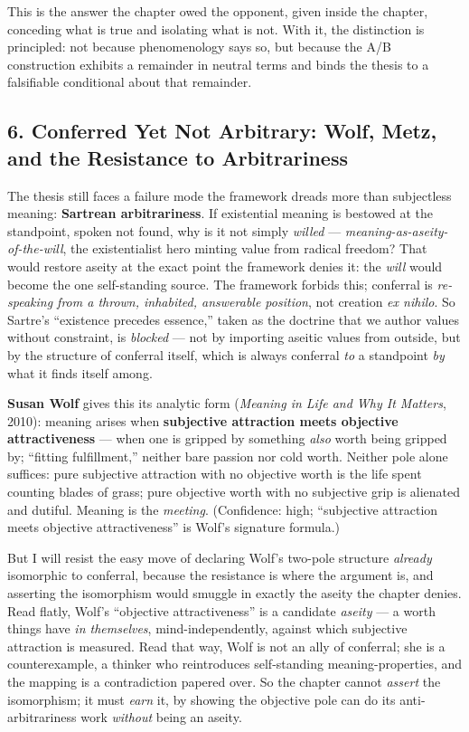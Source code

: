 \documentclass[11pt]{article}
\begin{document}
This is the answer the chapter owed the opponent, given inside the chapter, conceding what is true and isolating what is not. With it, the distinction is principled: not because phenomenology says so, but because the A/\allowbreak{}B construction exhibits a remainder in neutral terms and binds the thesis to a falsifiable conditional about that remainder.

\subsection*{6. Conferred Yet Not Arbitrary: Wolf, Metz, and the Resistance to Arbitrariness}

The thesis still faces a failure mode the framework dreads more than subjectless meaning: \textbf{Sartrean arbitrariness}. If existential meaning is bestowed at the standpoint, spoken not found, why is it not simply \emph{willed} — \emph{meaning-as-aseity-of-the-will}, the existentialist hero minting value from radical freedom? That would restore aseity at the exact point the framework denies it: the \emph{will} would become the one self-standing source. The framework forbids this; conferral is \emph{re-speaking from a thrown, inhabited, answerable position}, not creation \emph{ex nihilo}. So Sartre's ``existence precedes essence,'' taken as the doctrine that we author values without constraint, is \emph{blocked} — not by importing aseitic values from outside, but by the structure of conferral itself, which is always conferral \emph{to} a standpoint \emph{by} what it finds itself among.

\textbf{Susan Wolf} gives this its analytic form (\emph{Meaning in Life and Why It Matters}, 2010): meaning arises when \textbf{subjective attraction meets objective attractiveness} — when one is gripped by something \emph{also} worth being gripped by; ``fitting fulfillment,'' neither bare passion nor cold worth. Neither pole alone suffices: pure subjective attraction with no objective worth is the life spent counting blades of grass; pure objective worth with no subjective grip is alienated and dutiful. Meaning is the \emph{meeting}. (Confidence: high; ``subjective attraction meets objective attractiveness'' is Wolf's signature formula.)

But I will resist the easy move of declaring Wolf's two-pole structure \emph{already} isomorphic to conferral, because the resistance is where the argument is, and asserting the isomorphism would smuggle in exactly the aseity the chapter denies. Read flatly, Wolf's ``objective attractiveness'' is a candidate \emph{aseity} — a worth things have \emph{in themselves}, mind-independently, against which subjective attraction is measured. Read that way, Wolf is not an ally of conferral; she is a counterexample, a thinker who reintroduces self-standing meaning-properties, and the mapping is a contradiction papered over. So the chapter cannot \emph{assert} the isomorphism; it must \emph{earn} it, by showing the objective pole can do its anti-arbitrariness work \emph{without} being an aseity.
\end{document}
